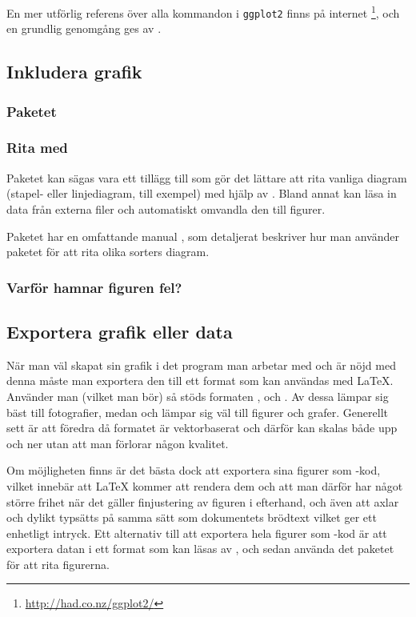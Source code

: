 \documentclass[lang=sv,ptsize=10pt,font=none,nomath,titles=bf,../../a4.tex]{subfiles}
\begin{document}
En mer utförlig referens över alla kommandon i \texttt{ggplot2} finns på internet%
\footnote{\url{http://had.co.nz/ggplot2/}}, och en grundlig genomgång ges av
\textcite{Hadley09}.

\subsection{Inkludera grafik}
\subsubsection{Paketet }
\subsubsection{Rita med \PGFTikZ}

Paketet  kan sägas vara ett tillägg till \PGFTikZ som gör
det lättare att rita vanliga diagram (stapel- eller linjediagram, till
exempel) med hjälp av \PGFTikZ. Bland annat kan  läsa in
data från externa filer och automatiskt omvandla den till figurer.

Paketet har en omfattande manual \parencite{Feuersanger10}, som detaljerat
beskriver hur man använder paketet för att rita olika sorters diagram.

\subsubsection{Varför hamnar figuren fel?}

\subsection{Exportera grafik eller data}
När man väl skapat sin grafik i det program man arbetar med och är nöjd
med denna måste man exportera den till ett format som kan användas med
\LaTeX. Använder man \pdfLaTeX (vilket man bör) så stöds formaten \JPEG,
\PNG och \PDF. Av dessa lämpar sig \JPEG bäst till fotografier, medan
\PNG och \PDF lämpar sig väl till figurer och grafer.
Generellt sett är \PDF att föredra då formatet är vektorbaserat och
därför kan skalas både upp och ner utan att man förlorar någon kvalitet.

Om möjligheten finns är det bästa dock att exportera sina figurer som
\PGFTikZ-kod, vilket innebär att \LaTeX{} kommer att rendera dem och att
man därför har något större frihet när det gäller finjustering av figuren
i efterhand, och även att axlar och dylikt typsätts på samma sätt som
dokumentets brödtext vilket ger ett enhetligt intryck. Ett alternativ
till att exportera hela figurer som \PGFTikZ-kod är att exportera datan
i ett format som kan läsas av , och sedan använda det
paketet för att rita figurerna.
\end{document}
